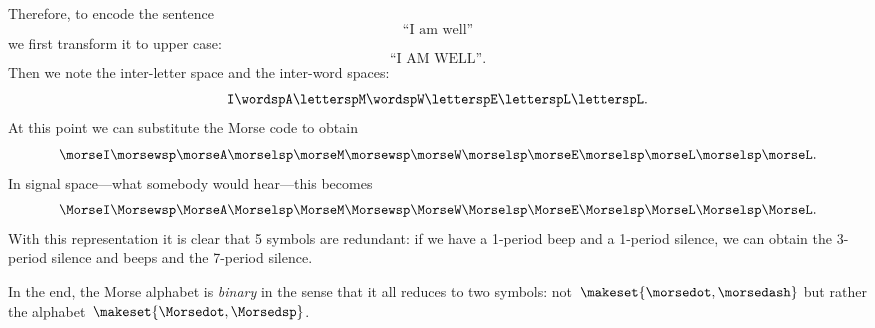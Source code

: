 \begin{example}
    Therefore, to encode the sentence
    \begin{equation}
        \text{``I am well''}
    \end{equation}
    we first transform it to upper case:
    \begin{equation}
        \text{``I AM WELL''}.
    \end{equation}
    Then we note the inter-letter space and the inter-word spaces:
    \begin{equation}
        \texttt{I} \wordsp \texttt{A} \lettersp \texttt{M} \wordsp \texttt{W} \lettersp
        \texttt{E} \lettersp \texttt{L} \lettersp \texttt{L}.
    \end{equation}
    At this point we can substitute the Morse code to obtain
    \begin{equation}
        \morseI \morsewsp \morseA \morselsp \morseM \morsewsp \morseW \morselsp \morseE \morselsp \morseL \morselsp \morseL.
    \end{equation}
    In signal space---what somebody would hear---this becomes
    \begin{equation}
        \MorseI \Morsewsp \MorseA \Morselsp \MorseM \Morsewsp \MorseW \Morselsp \MorseE \Morselsp \MorseL \Morselsp \MorseL.
    \end{equation}
    With this representation it is clear that 5 symbols are redundant: if we have a 1-period beep and a 1-period silence, we can obtain the 3-period silence and beeps and the 7-period silence.

    In the end, the Morse alphabet is \emph{binary} in the sense that it all reduces to two symbols: not~$\makeset{\morsedot, \morsedash}$ but rather the alphabet~$\makeset{\Morsedot, \Morsedsp}$.
\end{example}

